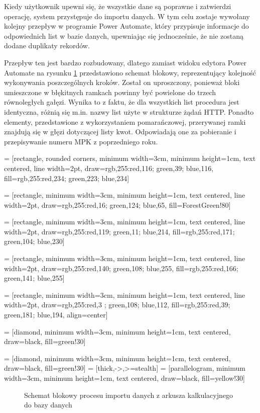 Kiedy użytkownik upewni się, że wszystkie dane są poprawne i zatwierdzi operację, system przystępuje do importu danych. W tym celu zostaje wywołany kolejny przepływ w programie Power Automate, który przypisuje informacje do odpowiednich list w bazie danych, upewniając się jednocześnie, że nie zostaną dodane duplikaty rekordów.

\noindent Przepływ ten jest bardzo rozbudowany, dlatego zamiast widoku edytora Power Automate na rysunku \ref{fig:flowchart} przedstawiono schemat blokowy, reprezentujący kolejność wykonywania poszczególnych kroków. Został on uproszczony, ponieważ bloki umieszczone w błękitnych ramkach powinny być powielone do trzech równoległych gałęzi. Wynika to z faktu, że dla wszystkich list procedura jest identyczna, różnią się m.in. nazwy list użyte w strukturze żądań HTTP. Ponadto elementy, przedstawione z wykorzystaniem pomarańczowej, przerywanej ramki znajdują się w głęzi dotyczącej listy kwot. Odpowiadają one za pobieranie i przepisywanie numeru MPK z poprzedniego roku.


{} = [rectangle, rounded corners, minimum width=3cm, minimum height=1cm, text centered, line width=2pt, draw={rgb,255:red,116; green,39; blue,116}, fill={rgb,255:red,234; green,223; blue,234}]

 = [rectangle, minimum width=3cm, minimum height=1cm, text centered, line width=2pt, draw={rgb,255:red,16; green,124; blue,65}, fill=ForestGreen!80]

 = [rectangle, minimum width=3cm, minimum height=1cm, text centered, line width=2pt, draw={rgb,255:red,119; green,11; blue,214}, fill={rgb,255:red,171; green,104; blue,230}]

 = [rectangle, minimum width=3cm, minimum height=1cm, text centered, line width=2pt, draw={rgb,255:red,140; green,108; blue,255}, fill={rgb,255:red,166; green,141; blue,255}]

 = [rectangle, minimum width=3cm, minimum height=1cm, text centered, line width=2pt, draw={rgb,255:red,3 ; green,108; blue,112}, fill={rgb,255:red,39; green,181; blue,194}, align=center]

 = [diamond, minimum width=3cm, minimum height=1cm, text centered, draw=black, fill=green!30]

 = [diamond, minimum width=3cm, minimum height=1cm, text centered, draw=black, fill=green!30]
 = [thick,->,>=stealth]
 = [parallelogram, minimum width=3cm, minimum height=1cm, text centered, draw=black, fill=yellow!30]
\begin{figure}
    \resizebox{0.95\textwidth}{!}{%
        
    }
    \caption{Schemat blokowy procesu importu danych z arkusza kalkulacyjnego do bazy danych}
    \label{fig:flowchart}
\end{figure}

